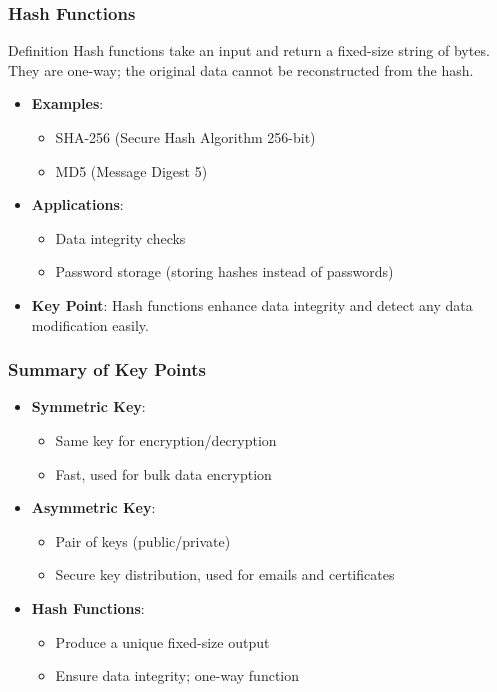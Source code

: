 \documentclass{beamer}
\begin{document}
\begin{frame}[fragile]
    \frametitle{Hash Functions}
    \begin{block}{Definition}
        Hash functions take an input and return a fixed-size string of bytes. They are one-way; the original data cannot be reconstructed from the hash.
    \end{block}
    \begin{itemize}
        \item \textbf{Examples}:
        \begin{itemize}
            \item SHA-256 (Secure Hash Algorithm 256-bit)
            \item MD5 (Message Digest 5)
        \end{itemize}
        \item \textbf{Applications}:
        \begin{itemize}
            \item Data integrity checks
            \item Password storage (storing hashes instead of passwords)
        \end{itemize}
        \item \textbf{Key Point}: 
        Hash functions enhance data integrity and detect any data modification easily.
    \end{itemize}
\end{frame}

\begin{frame}[fragile]
    \frametitle{Summary of Key Points}
    \begin{itemize}
        \item \textbf{Symmetric Key}:
        \begin{itemize}
            \item Same key for encryption/decryption
            \item Fast, used for bulk data encryption
        \end{itemize}
        \item \textbf{Asymmetric Key}:
        \begin{itemize}
            \item Pair of keys (public/private)
            \item Secure key distribution, used for emails and certificates
        \end{itemize}
        \item \textbf{Hash Functions}:
        \begin{itemize}
            \item Produce a unique fixed-size output
            \item Ensure data integrity; one-way function
        \end{itemize}
    \end{itemize}
\end{frame}
\end{document}

